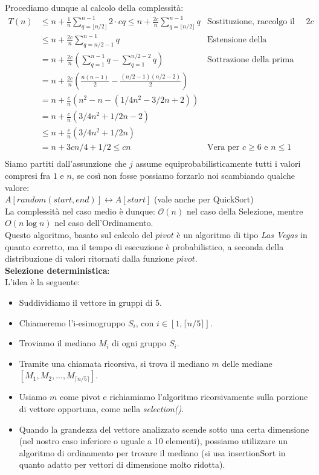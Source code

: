 \documentclass[../cheatSheetAlgoritmi.tex]{subfiles}
\begin{document}
Procediamo dunque al calcolo della complessità:
\begin{align*}
	 T(n) & \leq n + \frac{1}{n} \sum_{q = \lfloor n/2 \rfloor}^{n-1} 2  \cdot cq \leq n + \frac{2c}{n} \sum_{q = \lfloor n/2 \rfloor}^{n-1} q & \text{Sostituzione, raccolgo il fattore $2c$} \\
	& \leq n + \frac{2c}{n} \sum_{q = n/2 - 1}^{n-1} q & \text{Estensione della sommatoria} \\
	& = n + \frac{2c}{n} \left( \sum_{q = 1}^{n-1} q -  \sum_{q = 1}^{n/2 - 2} q \right) & \text{Sottrazione della prima parte} \\
	& = n + \frac{2c}{n} \left( \frac{n (n - 1)}{2} - \frac{(n/2 - 1)(n/2 - 2)}{2}\right) &\\
	& = n + \frac{c}{n} \left(n^2 - n - (1/4 n^2 - 3/2n + 2) \right) & \\
	& = n + \frac{c}{n} \left(3/4n^2 + 1/2 n - 2 \right) & \\
	& \leq n + \frac{c}{n} \left(3/4n^2 + 1/2 n \right) & \\
	& = n + 3cn/4 +1/2 \leq cn & \text{Vera per $c \geq 6$ e $n \leq 1$} \\
\end{align*}
Siamo partiti dall’assunzione che $j$ assume equiprobabilisticamente tutti i valori compresi fra $1$ e $n$, se così non fosse possiamo forzarlo noi scambiando qualche valore: \\
$A[random(start,end)] \leftrightarrow A[start]$ (vale anche per QuickSort)\\
La complessità nel caso medio è dunque: $\mathcal{O}(n)$ nel caso della Selezione, mentre $O(n \log n)$ nel caso dell’Ordinamento. \\
Questo algoritmo, basato sul calcolo del $pivot$ è un algoritmo di tipo \emph{Las Vegas} in quanto corretto, ma il tempo di esecuzione è probabilistico, a seconda della distribuzione di valori ritornati dalla funzione $pivot$. \\
\textbf{Selezione deterministica}: \\
L'idea è la seguente:
\begin{itemize}
	\item Suddividiamo il vettore in gruppi di 5.
	\item Chiameremo l’i-esimogruppo $S_i$, con $i \in [1, \lceil n/5 \rceil]$. 
	\item Troviamo il mediano $M_i$ di ogni gruppo $S_i$. 
	\item Tramite una chiamata ricorsiva, si trova il mediano $m$ delle mediane $[M_1,M_2,...,M_{\lceil n/5 \rceil}]$. 
	\item Usiamo $m$ come pivot e richiamiamo l'algoritmo ricorsivamente sulla porzione di vettore opportuna, come nella \emph{selection()}.
	\item Quando la grandezza del vettore analizzato scende sotto una certa dimensione (nel nostro caso inferiore o uguale a 10 elementi), possiamo utilizzare un algoritmo di ordinamento per trovare il mediano (si usa insertionSort in quanto adatto per vettori di dimensione molto ridotta).
\end{itemize}
\end{document}
